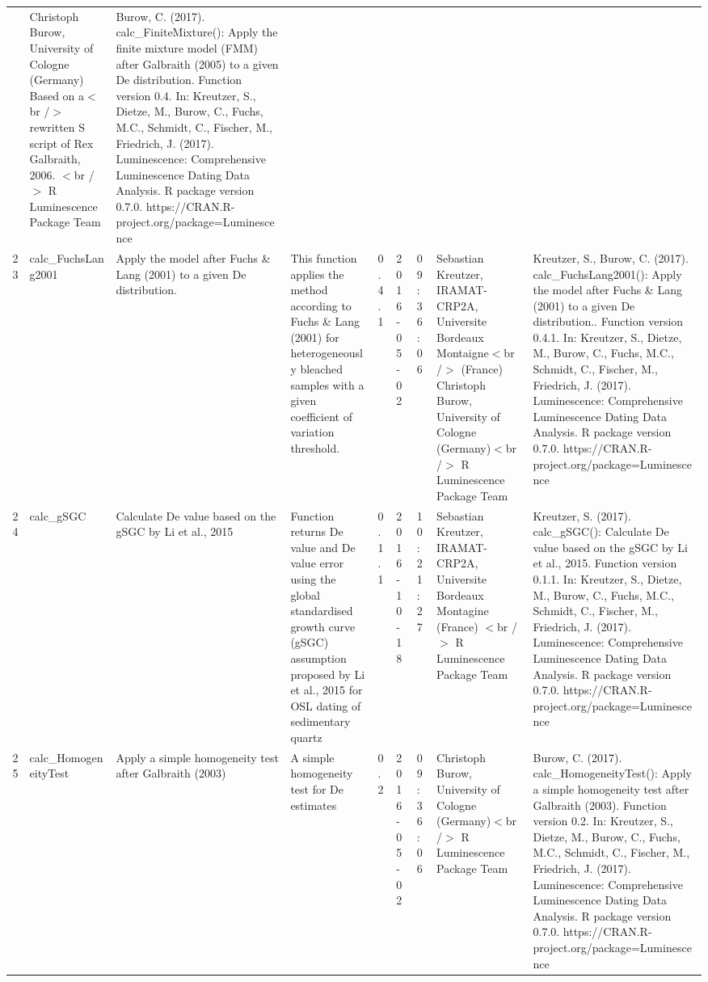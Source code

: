 \begin{table}[ht]
\begin{tabular}{rllllllll}
 & Christoph Burow, University of Cologne (Germany)   Based on a$<$br /$>$ rewritten S script of Rex Galbraith, 2006.  $<$br /$>$  R Luminescence Package Team & Burow, C. (2017). calc\_FiniteMixture(): Apply the finite mixture model (FMM) after Galbraith (2005) to a given De distribution. Function version 0.4. In: Kreutzer, S., Dietze, M., Burow, C., Fuchs, M.C., Schmidt, C., Fischer, M., Friedrich, J. (2017). Luminescence: Comprehensive Luminescence Dating Data Analysis. R package version 0.7.0. https://CRAN.R-project.org/package=Luminescence
 \\ 
  23 & calc\_FuchsLang2001 & Apply the model after Fuchs \& Lang (2001) to a given De distribution. & This function applies the method according to Fuchs \& Lang (2001) for heterogeneously bleached samples with a given coefficient of variation threshold. & 0.4.1 & 2016-05-02 & 09:36:06
 & Sebastian Kreutzer, IRAMAT-CRP2A, Universite Bordeaux Montaigne$<$br /$>$ (France) Christoph Burow, University of Cologne (Germany)$<$br /$>$  R Luminescence Package Team & Kreutzer, S., Burow, C. (2017). calc\_FuchsLang2001(): Apply the model after Fuchs \& Lang (2001) to a given De distribution.. Function version 0.4.1. In: Kreutzer, S., Dietze, M., Burow, C., Fuchs, M.C., Schmidt, C., Fischer, M., Friedrich, J. (2017). Luminescence: Comprehensive Luminescence Dating Data Analysis. R package version 0.7.0. https://CRAN.R-project.org/package=Luminescence
 \\ 
  24 & calc\_gSGC & Calculate De value based on the gSGC by Li et al., 2015 & Function returns De value and De value error using the global standardised growth curve (gSGC) assumption proposed by Li et al., 2015 for OSL dating of sedimentary quartz & 0.1.1 & 2016-10-18 & 10:21:27
 & Sebastian Kreutzer, IRAMAT-CRP2A, Universite Bordeaux Montagine (France) $<$br /$>$  R Luminescence Package Team & Kreutzer, S. (2017). calc\_gSGC(): Calculate De value based on the gSGC by Li et al., 2015. Function version 0.1.1. In: Kreutzer, S., Dietze, M., Burow, C., Fuchs, M.C., Schmidt, C., Fischer, M., Friedrich, J. (2017). Luminescence: Comprehensive Luminescence Dating Data Analysis. R package version 0.7.0. https://CRAN.R-project.org/package=Luminescence
 \\ 
  25 & calc\_HomogeneityTest & Apply a simple homogeneity test after Galbraith (2003) & A simple homogeneity test for De estimates & 0.2 & 2016-05-02 & 09:36:06
 & Christoph Burow, University of Cologne (Germany)$<$br /$>$  R Luminescence Package Team & Burow, C. (2017). calc\_HomogeneityTest(): Apply a simple homogeneity test after Galbraith (2003). Function version 0.2. In: Kreutzer, S., Dietze, M., Burow, C., Fuchs, M.C., Schmidt, C., Fischer, M., Friedrich, J. (2017). Luminescence: Comprehensive Luminescence Dating Data Analysis. R package version 0.7.0. https://CRAN.R-project.org/package=Luminescence

\end{tabular}
\end{table}
